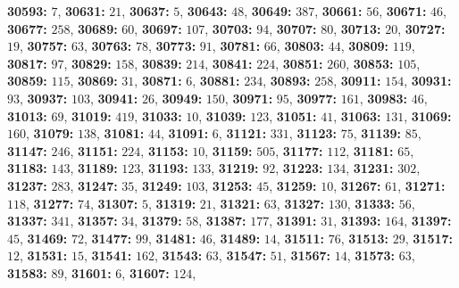 \textsf{\bfseries 30593:} $7$, \textsf{\bfseries 30631:} $21$, \textsf{\bfseries 30637:} $5$, \textsf{\bfseries 30643:} $48$, \textsf{\bfseries 30649:} $387$, \textsf{\bfseries 30661:} $56$, \textsf{\bfseries 30671:} $46$, \textsf{\bfseries 30677:} $258$, \textsf{\bfseries 30689:} $60$, \textsf{\bfseries 30697:} $107$, \textsf{\bfseries 30703:} $94$, \textsf{\bfseries 30707:} $80$, \textsf{\bfseries 30713:} $20$, \textsf{\bfseries 30727:} $19$, \textsf{\bfseries 30757:} $63$, \textsf{\bfseries 30763:} $78$, \textsf{\bfseries 30773:} $91$, \textsf{\bfseries 30781:} $66$, \textsf{\bfseries 30803:} $44$, \textsf{\bfseries 30809:} $119$, \textsf{\bfseries 30817:} $97$, \textsf{\bfseries 30829:} $158$, \textsf{\bfseries 30839:} $214$, \textsf{\bfseries 30841:} $224$, \textsf{\bfseries 30851:} $260$, \textsf{\bfseries 30853:} $105$, \textsf{\bfseries 30859:} $115$, \textsf{\bfseries 30869:} $31$, \textsf{\bfseries 30871:} $6$, \textsf{\bfseries 30881:} $234$, \textsf{\bfseries 30893:} $258$, \textsf{\bfseries 30911:} $154$, \textsf{\bfseries 30931:} $93$, \textsf{\bfseries 30937:} $103$, \textsf{\bfseries 30941:} $26$, \textsf{\bfseries 30949:} $150$, \textsf{\bfseries 30971:} $95$, \textsf{\bfseries 30977:} $161$, \textsf{\bfseries 30983:} $46$, \textsf{\bfseries 31013:} $69$, \textsf{\bfseries 31019:} $419$, \textsf{\bfseries 31033:} $10$, \textsf{\bfseries 31039:} $123$, \textsf{\bfseries 31051:} $41$, \textsf{\bfseries 31063:} $131$, \textsf{\bfseries 31069:} $160$, \textsf{\bfseries 31079:} $138$, \textsf{\bfseries 31081:} $44$, \textsf{\bfseries 31091:} $6$, \textsf{\bfseries 31121:} $331$, \textsf{\bfseries 31123:} $75$, \textsf{\bfseries 31139:} $85$, \textsf{\bfseries 31147:} $246$, \textsf{\bfseries 31151:} $224$, \textsf{\bfseries 31153:} $10$, \textsf{\bfseries 31159:} $505$, \textsf{\bfseries 31177:} $112$, \textsf{\bfseries 31181:} $65$, \textsf{\bfseries 31183:} $143$, \textsf{\bfseries 31189:} $123$, \textsf{\bfseries 31193:} $133$, \textsf{\bfseries 31219:} $92$, \textsf{\bfseries 31223:} $134$, \textsf{\bfseries 31231:} $302$, \textsf{\bfseries 31237:} $283$, \textsf{\bfseries 31247:} $35$, \textsf{\bfseries 31249:} $103$, \textsf{\bfseries 31253:} $45$, \textsf{\bfseries 31259:} $10$, \textsf{\bfseries 31267:} $61$, \textsf{\bfseries 31271:} $118$, \textsf{\bfseries 31277:} $74$, \textsf{\bfseries 31307:} $5$, \textsf{\bfseries 31319:} $21$, \textsf{\bfseries 31321:} $63$, \textsf{\bfseries 31327:} $130$, \textsf{\bfseries 31333:} $56$, \textsf{\bfseries 31337:} $341$, \textsf{\bfseries 31357:} $34$, \textsf{\bfseries 31379:} $58$, \textsf{\bfseries 31387:} $177$, \textsf{\bfseries 31391:} $31$, \textsf{\bfseries 31393:} $164$, \textsf{\bfseries 31397:} $45$, \textsf{\bfseries 31469:} $72$, \textsf{\bfseries 31477:} $99$, \textsf{\bfseries 31481:} $46$, \textsf{\bfseries 31489:} $14$, \textsf{\bfseries 31511:} $76$, \textsf{\bfseries 31513:} $29$, \textsf{\bfseries 31517:} $12$, \textsf{\bfseries 31531:} $15$, \textsf{\bfseries 31541:} $162$, \textsf{\bfseries 31543:} $63$, \textsf{\bfseries 31547:} $51$, \textsf{\bfseries 31567:} $14$, \textsf{\bfseries 31573:} $63$, \textsf{\bfseries 31583:} $89$, \textsf{\bfseries 31601:} $6$, \textsf{\bfseries 31607:} $124$, 
